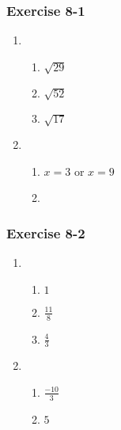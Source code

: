 \subsubsection*{Exercise 8-1} %
\begin{enumerate}[label=\textbf{\arabic*}.]
\item %
 \begin{enumerate}[noitemsep, label=\textbf{(\alph*)} ] 
\item $\sqrt{29}$%
\item $\sqrt{52}$%
\item $\sqrt{17}$%
\end{enumerate}

\item %
 \begin{enumerate}[noitemsep, label=\textbf{(\alph*)} ] 
\item $x = 3$ or $x = 9$%
\item %
\end{enumerate}
\end{enumerate}

\subsubsection*{Exercise 8-2} %
\begin{enumerate}[noitemsep, label=\textbf{\arabic*}. ]
\item %
 \begin{enumerate}[noitemsep, label=\textbf{(\alph*)} ] 
\item $1$%
\item $\frac{11}{8}$%
\item $\frac{4}{3}$%
\end{enumerate}

\item %
\begin{enumerate}[noitemsep, label=\textbf{(\alph*)} ] 
\item $\frac{-10}{3}$%
\item $5$%
\end{enumerate}
\end{enumerate}


